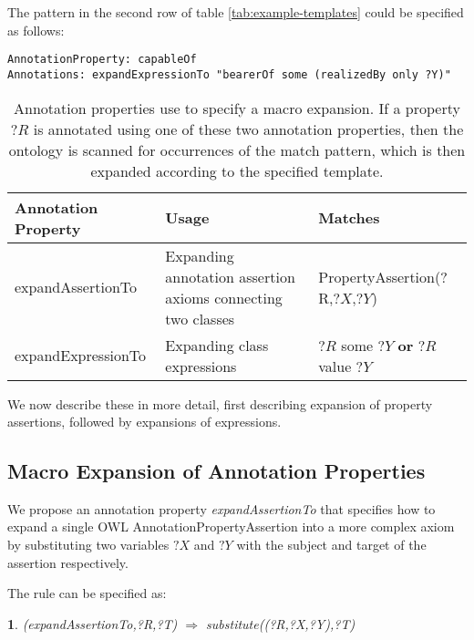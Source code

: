 \documentclass{llncs}
\newtheorem{exprule}{}[section]
\begin{document}
The pattern in the second row of table \ref{tab:example-templates}
could be specified as follows:

\begin{verbatim}
AnnotationProperty: capableOf
Annotations: expandExpressionTo "bearerOf some (realizedBy only ?Y)"
\end{verbatim}

  \begin{table}
    \begin{tabular}{ | p{3.2cm} | p{4.5cm} | p{4.5cm} | }
      \hline 
      \textbf{Annotation Property} & \textbf{Usage} & \textbf{Matches} \\

      \hline
      expandAssertionTo & Expanding annotation assertion axioms connecting two classes & PropertyAssertion(?R,$?X$,$?Y$) \\

      \hline
      expandExpressionTo & Expanding class expressions & 
      $?R$ some $?Y$ \textbf{or} \newline
      $?R$ value $?Y$ \\

      \hline
    \end{tabular}
    \caption{Annotation properties use to specify a macro
      expansion. If a property $?R$ is annotated using one of these
      two annotation properties, then the ontology is scanned for
      occurrences of the match pattern, which is then expanded
      according to the specified template.}
    \label{tab:macro-expansion}
  \end{table}

We now describe these in more detail, first describing expansion of
property assertions, followed by expansions of expressions.

\subsection{Macro Expansion of Annotation Properties}

We propose an annotation property \emph{expandAssertionTo} that
specifies how to expand a single OWL AnnotationPropertyAssertion into a more
complex axiom by substituting two variables $?X$ and $?Y$ with the
subject and target of the assertion respectively.

The rule can be specified as:

\begin{exprule}\label{exp-pa}
(expandAssertionTo,?R,?T)  $\Rightarrow$ \newline
 substitute((?R,?X,?Y),?T)
\end{exprule}
\end{document}
